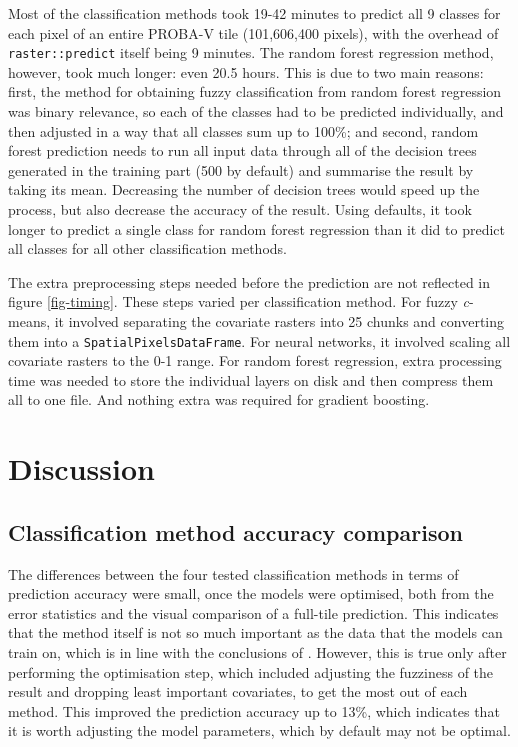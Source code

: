 \documentclass[a4paper,10pt]{book}
\begin{document}
Most of the classification methods took 19-42 minutes to predict all 9 classes for each pixel of an entire PROBA-V tile (101,606,400 pixels), with the overhead of \texttt{raster::predict} itself being 9 minutes. The random forest regression method, however, took much longer: even 20.5 hours. This is due to two main reasons: first, the method for obtaining fuzzy classification from random forest regression was binary relevance, so each of the classes had to be predicted individually, and then adjusted in a way that all classes sum up to 100\%; and second, random forest prediction needs to run all input data through all of the decision trees generated in the training part (500 by default) and summarise the result by taking its mean. Decreasing the number of decision trees would speed up the process, but also decrease the accuracy of the result. Using defaults, it took longer to predict a single class for random forest regression than it did to predict all classes for all other classification methods.

The extra preprocessing steps needed before the prediction are not reflected in figure \ref{fig-timing}. These steps varied per classification method. For fuzzy \textit{c}-means, it involved separating the covariate rasters into 25 chunks and converting them into a \texttt{SpatialPixelsDataFrame}. For neural networks, it involved scaling all covariate rasters to the 0-1 range. For random forest regression, extra processing time was needed to store the individual layers on disk and then compress them all to one file. And nothing extra was required for gradient boosting.

\chapter{Discussion}

\section{Classification method accuracy comparison}

The differences between the four tested classification methods in terms of prediction accuracy were small, once the models were optimised, both from the error statistics and the visual comparison of a full-tile prediction. This indicates that the method itself is not so much important as the data that the models can train on, which is in line with the conclusions of \citet{yu2014metadiscoveries}. However, this is true only after performing the optimisation step, which included adjusting the fuzziness of the result and dropping least important covariates, to get the most out of each method. This improved the prediction accuracy up to 13\%, which indicates that it is worth adjusting the model parameters, which by default may not be optimal.
\end{document}
